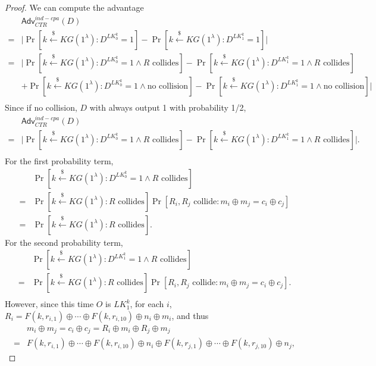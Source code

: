 \documentclass[12pt]{article}
\newcommand{\getsr}{\stackrel{\$}{\gets}}
\newcommand{\Adv}{\textsf{Adv}}
\theoremstyle{definition}
\begin{document}
\begin{proof}
We can compute the advantage 
$$\begin{aligned}
& \Adv_{CTR}^{ind-cpa}(D) \\
=& \bigg| \Pr[k \getsr KG(1^\lambda) : D^{LK_0^k}=1] - \Pr[k \getsr KG(1^\lambda) : D^{LK_1^k}=1] \bigg| \\
=& \bigg| \Pr[k \getsr KG(1^\lambda) : D^{LK_0^k}=1 \wedge \textrm{$R$ collides}] - \Pr[k \getsr KG(1^\lambda) : D^{LK_1^k}=1 \wedge \textrm{$R$ collides}] \\
&+\Pr[k \getsr KG(1^\lambda) : D^{LK_0^k}=1 \wedge \textrm{no collision}] - \Pr[k \getsr KG(1^\lambda) : D^{LK_1^k}=1 \wedge \textrm{no collision}] \bigg| \\
\end{aligned}$$
Since if no collision, $D$ with always output 1 with probability 1/2,
$$\begin{aligned}
& \Adv_{CTR}^{ind-cpa}(D) \\
=& \bigg| \Pr[k \getsr KG(1^\lambda) : D^{LK_0^k}=1 \wedge \textrm{$R$ collides}] - \Pr[k \getsr KG(1^\lambda) : D^{LK_1^k}=1 \wedge \textrm{$R$ collides}] \bigg|. \\
\end{aligned}$$
For the first probability term,
$$\begin{aligned}
& \Pr[k \getsr KG(1^\lambda) : D^{LK_0^k}=1 \wedge \textrm{$R$ collides}] \\
=& \Pr[k \getsr KG(1^\lambda): \textrm{$R$ collides}]\Pr[\textrm{$R_i, R_j$ collide} : m_i \oplus m_j = c_i \oplus c_j] \\
=& \Pr[k \getsr KG(1^\lambda): \textrm{$R$ collides}].
\end{aligned}$$
For the second probability term,
$$\begin{aligned}
& \Pr[k \getsr KG(1^\lambda) : D^{LK_1^k}=1 \wedge \textrm{$R$ collides}] \\
=& \Pr[k \getsr KG(1^\lambda): \textrm{$R$ collides}]\Pr[\textrm{$R_i, R_j$ collide} : m_i \oplus m_j = c_i \oplus c_j]. \\
\end{aligned}$$
However, since this time $O$ is $LK_1^k$, for each $i$, $R_i = F(k, r_{i,1}) \oplus \cdots \oplus F(k, r_{i,10}) \oplus n_i \oplus m_i$, and thus 
$$\begin{aligned}
&m_i \oplus m_j = c_i \oplus c_j = R_i \oplus m_i \oplus R_j \oplus m_j \\
=& F(k, r_{i,1}) \oplus \cdots \oplus F(k, r_{i,10}) \oplus n_i \oplus F(k, r_{j,1}) \oplus \cdots \oplus F(k, r_{j,10}) \oplus n_j,
\end{aligned}$$

\end{proof}
\end{document}
